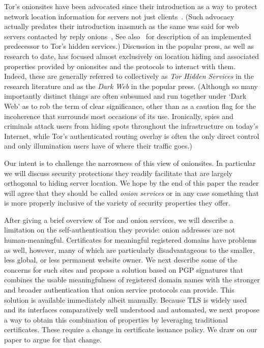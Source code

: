 \documentclass[10pt, conference, compsocconf]{styles/IEEEtran}
\begin{document}
Tor's onionsites have been advocated since their introduction as a way
to protect network location information for servers not just
clients~\cite{tor-design}. (Such advocacy actually predates their
introduction inasmuch as the same was said for web servers contacted
by reply onions~\cite{onion-routing:cacm99}, See also~\cite{rewebber}
for description of an implemented predecessor to Tor's hidden
services.)  Discussion in the popular press, as well as research to
date, has focused almost exclusively on location hiding and associated
properties provided by onionsites and the protocols to interact with
them. Indeed, these are generally referred to collectively as
\emph{Tor Hidden Services} in the research literature and as the
\emph{Dark Web} in the popular press. (Although so many importantly
distinct things are often subsumed and run together under `Dark Web'
as to rob the term of clear significance, other than as a caution flag
for the incoherence that surrounds most occasions of its
use. Ironically, spies and criminals attack users from hiding spots
throughout the infrastructure on today's Internet, while Tor's
authenticated routing overlay is often the only direct control and
only illumination users have of where their traffic goes.)

Our intent is to challenge the narrowness of this view of
onionsites. In particular we will discuss security protections they
readily facilitate that are largely orthogonal to hiding server
location. We hope by the end of this paper the reader will agree that
they should be called \emph{onion services} or in any
case something that is more properly inclusive of the variety of
security properties they offer.


After giving a brief overview of Tor and onion services, we will
describe a limitation on the self-authentication they provide: onion
addresses are not human-meaningful. Certificates for meaningful
registered domains have problems as well, however, many of which are
particularly disadvantageous to the smaller, less global, or less
permanent website owner.  We next describe some of the concerns for such
sites and propose a solution based on PGP signatures that combines the
usable meaningfulness of registered domain names with the stronger and
broader authentication that onion service protocols can provide.  This
solution is available immediately albeit manually.  Because TLS is
widely used and its interfaces comparatively well
understood and automated, we next propose a way to obtain this
combination of properties by leveraging traditional certificates.
These require a change in certificate issuance policy.  We draw
on our paper to argue for that change.
\end{document}
